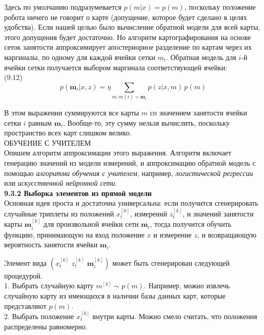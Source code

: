 \documentclass[10pt,a4paper]{article}
\begin{document}
Здесь по умолчанию подразумевается $p(m | x) = p(m)$, поскольку положение робота ничего не говорит о карте (допущение, которое будет сделано в целях удобства). Если нашей целью было вычисление обратной модели для всей карты, этого допущения будет достаточно. Но алгоритм картографирования на основе сеток занятости аппроксимирует апостериорное разделение по картам через их маргиналы, по одному для каждой ячейки сетки $m_i$. Обратная модель для $i$-й ячейки сетки получается выбором маргинала соответствующей ячейки:\\

(9.12)
$$p(\textbf{m}_i|x,z)=\eta\sum_{m:m(i)=\textbf{m}_i}p(z|x,m)\,p(m)$$

В этом выражении суммируются все карты $m$ со значением занятости ячейки сетки $i$ равным $\textbf{m}_i$. Вообще-то, эту сумму нельзя вычислить, поскольку пространство всех карт слишком велико.\\

ОБУЧЕНИЕ С УЧИТЕЛЕМ\\

Опишем алгоритм аппроксимации этого выражения. Алгоритм включает генерацию значений из модели измерений, и аппроксимацию обратной модель с помощью \textit{алгоритма обучения с учителем}, например,  \textit{логистической регрессии} или \textit{искусственной нейронной сети}.\\

\textbf{9.3.2	Выборка элементов из прямой модели}\\

Основная идея проста и достаточна универсальна: если получится сгенерировать случайные триплеты из положений $x_t^{[k]}$, измерений $z_t^{[k]}$, и значений занятости карты $\textbf{m}_i^{[k]}$  для произвольной ячейки сети $\textbf{m}_i$, тогда получится обучить функцию, принимающую на вход положение $x$ и измерение $z$, и возвращающую вероятность занятости ячейки $\textbf{m}_i$.

Элемент вида $(x_t^{[k]}\,\,z_t^{[k]}\,\,\textbf{m}_i^{[k]})$ может быть сгенерирован следующей процедурой.\\

1.	Выбрать случайную карту $m^{[k]}\sim p(m)$. Например, можно извлечь случайную карту из имеющихся в наличии базы данных карт, которые представляют $p(m)$.\\

2. Выбрать положение $x_t^{[k]}$ внутри карты. Можно смело считать, что положения распределены равномерно.\\
\end{document}
